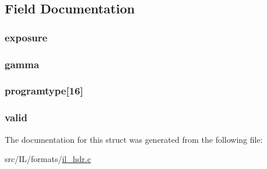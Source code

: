 \subsection{Field Documentation}
\hypertarget{structrgbe__header__info_ac038afb0d6bbc183478809667dff2cc5}{
\subsubsection[{exposure}]{ exposure}}\label{structrgbe__header__info_ac038afb0d6bbc183478809667dff2cc5}
\hypertarget{structrgbe__header__info_ab75fcdc81a4080498789adc642289878}{
\subsubsection[{gamma}]{ gamma}}\label{structrgbe__header__info_ab75fcdc81a4080498789adc642289878}
\hypertarget{structrgbe__header__info_afd7a3d511f313a2285921795770ac680}{
\subsubsection[{programtype}]{ programtype\mbox{[}16\mbox{]}}}\label{structrgbe__header__info_afd7a3d511f313a2285921795770ac680}
\hypertarget{structrgbe__header__info_a3315e77a958829d03f04081e4ef5055f}{
\subsubsection[{valid}]{ valid}}\label{structrgbe__header__info_a3315e77a958829d03f04081e4ef5055f}


The documentation for this struct was generated from the following file\-:\begin{DoxyCompactItemize}
\item 
src/\-I\-L/formats/\hyperlink{il__hdr_8c}{il\-\_\-hdr.\-c}\end{DoxyCompactItemize}
